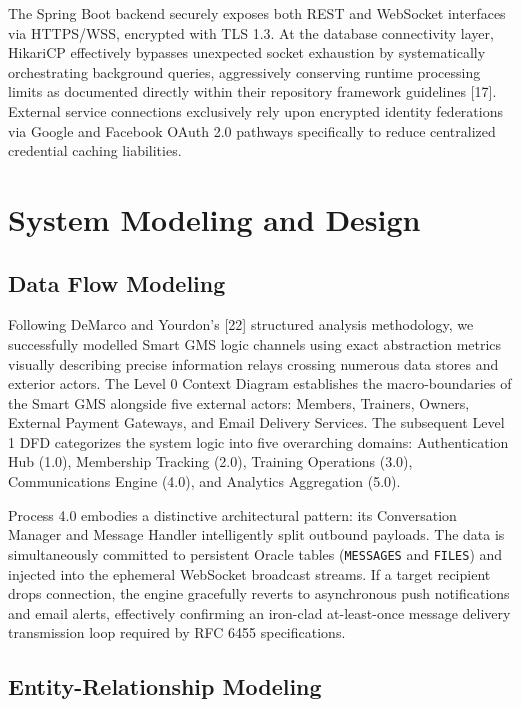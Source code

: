The Spring Boot backend securely exposes both REST and WebSocket
interfaces via HTTPS/WSS, encrypted with TLS 1.3. At the database
connectivity layer, HikariCP effectively bypasses unexpected socket
exhaustion by systematically orchestrating background queries,
aggressively conserving runtime processing limits as documented directly
within their repository framework guidelines {[}17{]}. External service
connections exclusively rely upon encrypted identity federations via
Google and Facebook OAuth 2.0 pathways specifically to reduce
centralized credential caching liabilities.

\section{System Modeling and Design}\label{system-modeling-and-design}

\subsection{Data Flow Modeling}\label{data-flow-modeling}

Following DeMarco and Yourdon's {[}22{]} structured analysis
methodology, we successfully modelled Smart GMS logic channels using
exact abstraction metrics visually describing precise information relays
crossing numerous data stores and exterior actors. The Level 0 Context
Diagram establishes the macro-boundaries of the Smart GMS alongside five
external actors: Members, Trainers, Owners, External Payment Gateways,
and Email Delivery Services. The subsequent Level 1 DFD categorizes the
system logic into five overarching domains: Authentication Hub (1.0),
Membership Tracking (2.0), Training Operations (3.0), Communications
Engine (4.0), and Analytics Aggregation (5.0).

Process 4.0 embodies a distinctive architectural pattern: its
Conversation Manager and Message Handler intelligently split outbound
payloads. The data is simultaneously committed to persistent Oracle
tables (\texttt{MESSAGES} and \texttt{FILES}) and injected into the
ephemeral WebSocket broadcast streams. If a target recipient drops
connection, the engine gracefully reverts to asynchronous push
notifications and email alerts, effectively confirming an iron-clad
at-least-once message delivery transmission loop required by RFC 6455
specifications.

\subsection{Entity-Relationship
Modeling}\label{entity-relationship-modeling}

